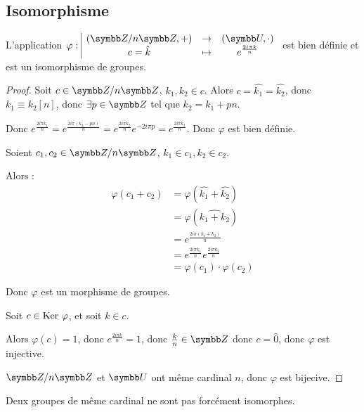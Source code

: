 \subsection{Isomorphisme}

\begin{theoreme}{}{}
    L'application $\fonction{\varphi}{(\Z/n\Z, +)}{(\symbb U, \cdot)}{c = \hat k}{e^{\frac{2i\pi k} n}}$
    est bien définie et est un isomorphisme de groupes.
\end{theoreme}

\begin{proof}
    Soit $c \in \Z /n \Z$, $k_1, k_2 \in c$. Alors $c = \hat{k_1} = \hat{k_2}$, donc
    $k_1 \equiv k_2 [n]$, donc $\exists p \in \Z$ tel que $k_2 = k_1 + pn$.

    Donc $\displaystyle e^{\frac{2i\pi k_1}n} = e^{\frac{2i\pi (k_2 - pn)} n} = e^{\frac{2i\pi k_2} n} e^{-2i\pi p} = e^{\frac{2i\pi k_2} n}$.
    Donc $\varphi$ est bien définie.

    \svspace Soient $c_1, c_2 \in \Z/n\Z$, $k_1 \in c_1, k_2 \in c_2$.

    Alors :
     \begin{align*}
        \varphi(c_1 + c_2) & = \varphi(\hat{k_1} + \hat{k_2}) \\
        & = \varphi(\widehat{k_1 + k_2}) \\
        & = e^{\frac{2i\pi (k_1 + k_2)} n} \\
        & = e^{\frac{2i\pi k_1} n} e^{\frac{2i\pi k_2} n} \\
        & = \varphi(c_1) \cdot \varphi(c_2)
    \end{align*}

    Donc $\varphi$ est un morphisme de groupes.

    Soit $c \in \operatorname{Ker} \, \varphi$, et soit $k \in c$.

    Alors $\varphi(c) = 1$, donc $e^{\frac{2i\pi k} n} = 1$, donc $\frac k n \in \Z$ donc 
    $c = \hat 0$, donc $\varphi$ est injective.

    \avspace $\Z / n \Z$ et $\symbb U$ ont même cardinal $n$, donc $\varphi$ est bijecive.
\end{proof}

\begin{remarque}
    Deux groupes de même cardinal ne sont pas forcément isomorphes.
\end{remarque}


